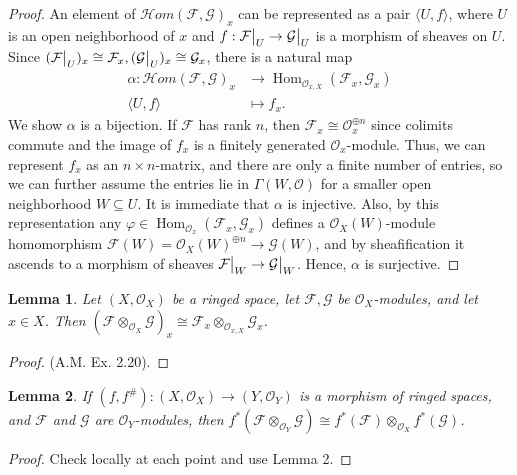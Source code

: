 \documentclass{article}
\newcommand{\fF}{\mathcal{F}}
\newcommand{\fG}{\mathcal{G}}
\newcommand{\fO}{\mathcal{O}}
\newtheorem{lemma}{Lemma}
\DeclareMathOperator{\Hom}{Hom}
\newcommand\restr[2]{{%
  \left.\kern-\nulldelimiterspace %
  #1 %
  \vphantom{\big|} %
  \right|_{#2} %
}}
\begin{document}
\begin{enumerate} [label=\textbf{\arabic*.}, leftmargin=0em]
\begin{proof}
    An element of $\mathcal{H}om(\fF, \fG)_x$ can be represented as a pair $\langle U, f \rangle$, where $U$ is an open neighborhood of $x$ and $f : \restr{\fF}{U} \to \restr{\fG}{U}$ is a morphism of sheaves on $U$. Since $(\restr{\fF}{U})_x \cong \fF_x, (\restr{\fG}{U})_x \cong \fG_x$, there is a natural map
    \begin{align*}
        \alpha : \mathcal{H}om(\fF, \fG)_x & \to \Hom_{\fO_{x, X}}(\fF_x, \fG_x) \\
        \langle U, f \rangle & \mapsto f_x.
    \end{align*}
    We show $\alpha$ is a bijection. If $\fF$ has rank $n$, then $\fF_x \cong \fO_{x}^{\oplus n}$ since colimits commute and the image of $f_x$ is a finitely generated $\fO_{x}$-module. Thus, we can represent $f_x$ as an $n \times n$-matrix, and there are only a finite number of entries, so we can further assume the entries lie in $\Gamma(W, \fO)$ for a smaller open neighborhood $W \subseteq U$. It is immediate that $\alpha$ is injective. Also, by this representation any $\varphi \in \Hom_{\fO_{x}}(\fF_x, \fG_x)$ defines a $\fO_X(W)$-module homomorphism $\fF(W) = \fO_{X}(W)^{\oplus n} \to \fG(W)$, and by sheafification it ascends to a morphism of sheaves $\restr{\fF}{W} \to \restr{\fG}{W}$. Hence, $\alpha$ is surjective.
\end{proof}

\begin{lemma}
    Let $(X, \fO_X)$ be a ringed space, let $\fF, \fG$ be $\fO_X$-modules, and let $x \in X$. Then $(\fF \otimes_{\fO_X} \fG)_x \cong \fF_x \otimes_{\fO_{x, X}} \fG_x$.
\end{lemma}

\begin{proof}
    (A.M. Ex. 2.20).
\end{proof}

\begin{lemma}
    If $(f, f^\#) : (X, \fO_X) \to (Y, \fO_Y)$ is a morphism of ringed spaces, and $\fF$ and $\fG$ are $\fO_Y$-modules, then $f^*(\fF \otimes_{\fO_Y} \fG) \cong f^*(\fF) \otimes_{\fO_X} f^*(\fG)$.
\end{lemma}

\begin{proof}
    Check locally at each point and use Lemma 2.
\end{proof}


\end{enumerate}
\end{document}
